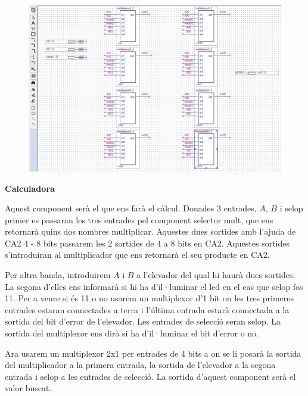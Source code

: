 \documentclass[12pt, a4papre]{article}
\begin{document}
	\begin{center}
	\begin{figure}[H]
		\begin{center}
		\includegraphics[width=150mm]{multiplexor2x1entrades4bits.jpeg}
		\end{center}
	\end{figure}
	\end{center}
	
	\textbf{\large{Calculadora}}
	
	Aquest component serà el que ens farà el càlcul. Donades 3 entrades, $A$, $B$ i selop primer es passaran les tres entrades pel component selector mult, que ens retornarà quins dos nombres multiplicar. Aquestes dues sortides amb l'ajuda de CA2 4 - 8 bits passarem les 2 sortides de 4 a 8 bits en CA2. Aquestes sortides s'introduiran al multiplicador que ens retornarà el seu producte en CA2.

	Per altra banda, introduirem $A$ i $B$ a l'elevador del qual hi haurà dues sortides. La segona d'elles ens informarà si hi ha d'il·luminar el led en el cas que selop fos 11. Per a veure si és 11 o no usarem un multiplexor d'1 bit on les tres primeres entrades estaran connectades a terra i l'última entrada estarà connectada a la sortida del bit d'error de l'elevador. Les entrades de selecció seran selop. La sortida del multiplexor ens dirà si ha d'il·luminar el bit d'error o no.

	Ara usarem un multiplexor 2x1 per entrades de 4 bits a on se li posarà la sortida del multiplicador a la primera entrada, la sortida de l'elevador a la segona entrada i selop a les entrades de selecció. La sortida d'aquest component serà el valor buscat.
	
\end{document}
